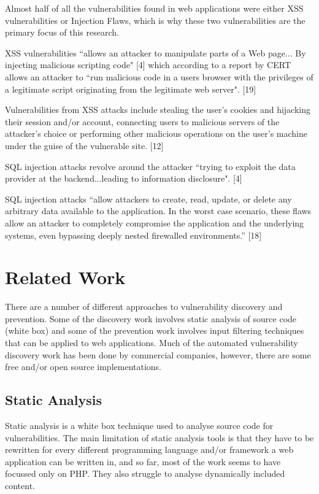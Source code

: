 \documentclass[12pt,a4paper]{article}
\begin{document}
Almost half of all the vulnerabilities found in web applications were either XSS vulnerabilities or Injection Flaws, which is why these two vulnerabilities are the primary focus of this research. 

XSS vulnerabilities ``allows an attacker to manipulate parts of a Web page... By injecting malicious scripting code" [4] which according to a report by CERT allows an attacker to ``run malicious code in a users browser with the privileges of a legitimate script originating from the legitimate web server". [19]

Vulnerabilities from XSS attacks include stealing the user's cookies and hijacking their session and/or account, connecting users to malicious servers of the attacker's choice or performing other malicious operations on the user's machine under the guise of the vulnerable site. [12]

SQL injection attacks revolve around the attacker ``trying to exploit the data provider at the backend...leading to information disclosure". [4]

SQL injection attacks “allow attackers to create, read, update, or delete any arbitrary data available to the application. In the worst case scenario, these flaws allow an attacker to completely compromise the application and the underlying systems, even bypassing deeply nested firewalled environments.” [18] 

\section{Related Work}
There are a number of different approaches to vulnerability discovery and prevention.  Some of the discovery work involves static analysis of source code (white box) and some of the prevention work involves input filtering techniques that can be applied to web applications.
Much of the automated vulnerability discovery work has been done by commercial companies, however, there are some free and/or open source implementations.

\subsection{Static Analysis}
Static analysis is a white box technique used to analyse source code for vulnerabilities.  The main limitation of static analysis tools is that they have to be rewritten for every different programming language and/or framework a web application can be written in, and so far, most of the work seems to have focussed only on PHP.  They also struggle to analyse dynamically included content.
\end{document}
